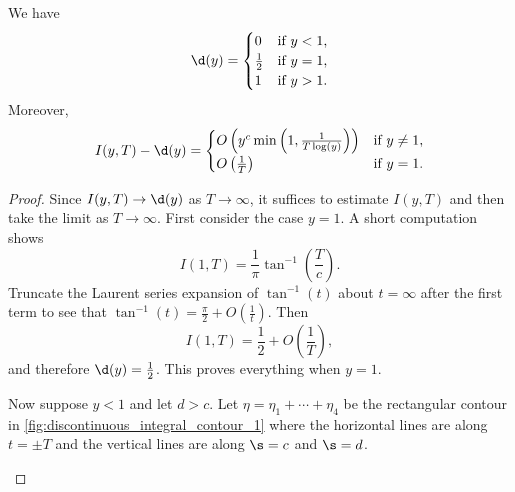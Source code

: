 \documentclass[12pt]{article}
\begin{document}
      \begin{lemma}\label{lem:delta_truncation_estimate}
        We have
        \[
          \d(y) = \begin{cases} 0 & \text{if \(y < 1\)}, \\ \frac{1}{2} & \text{if \(y = 1\)}, \\ 1 & \text{if \(y > 1\)}. \end{cases}
        \]
        Moreover,
        \[
          I(y,T)-\d(y) = \begin{cases} O\left(y^{c}\min\left(1,\frac{1}{T\log(y)}\right)\right) & \text{if \(y \neq 1\)}, \\ O\left(\frac{1}{T}\right) & \text{if \(y = 1\)}. \end{cases}
        \]
      \end{lemma}
      \begin{proof}
        Since \(I(y,T) \to \d(y)\) as \(T \to \infty\), it suffices to estimate \(I(y,T)\) and then take the limit as \(T \to \infty\). First consider the case \(y = 1\). A short computation shows
        \[
          I(1,T) = \frac{1}{\pi}\tan^{-1}\left(\frac{T}{c}\right).
        \]
        Truncate the Laurent series expansion of \(\tan^{-1}(t)\) about \(t = \infty\) after the first term to see that \(\tan^{-1}(t) = \frac{\pi}{2}+O\left(\frac{1}{t}\right)\). Then
        \[
          I(1,T) = \frac{1}{2}+O\left(\frac{1}{T}\right),
        \] 
        and therefore \(\d(y) = \frac{1}{2}\). This proves everything when \(y = 1\).
        
        Now suppose \(y < 1\) and let \(d > c\). Let \(\eta = \eta_{1}+\cdots+\eta_{4}\) be the rectangular contour in \cref{fig:discontinuous_integral_contour_1} where the horizontal lines are along \(t = \pm T\) and the vertical lines are along \(\s = c\) and \(\s = d\).

        \begin{figure}[h]
          \centering
\end{figure}
\end{proof}
\end{document}
